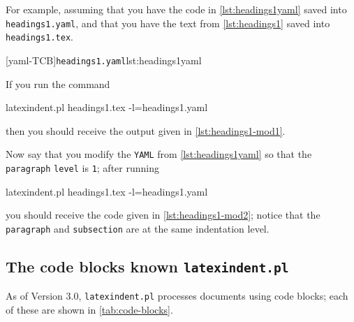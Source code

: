 	For example, assuming that you have the code in \cref{lst:headings1yaml} saved into \texttt{headings1.yaml},
	and that you have the text from \cref{lst:headings1} saved into \texttt{headings1.tex}.

	\begin{minipage}{.45\textwidth}
		[yaml-TCB]{\texttt{headings1.yaml}}{lst:headings1yaml}
	\end{minipage}%
	\hfill
	\begin{minipage}{.45\textwidth}
	\end{minipage}

	If you run the command
	\begin{commandshell}
latexindent.pl headings1.tex -l=headings1.yaml
\end{commandshell}
	then you should receive the output given in \cref{lst:headings1-mod1}.

	\begin{minipage}{.45\textwidth}
	\end{minipage}%
	\hfill
	\begin{minipage}{.45\textwidth}
	\end{minipage}

	Now say that you modify the \texttt{YAML} from \cref{lst:headings1yaml} so that the \texttt{paragraph} \texttt{level} is \texttt{1}; after
	running
	\begin{commandshell}
latexindent.pl headings1.tex -l=headings1.yaml
\end{commandshell}
	you should receive the code given in \cref{lst:headings1-mod2}; notice that
	the \texttt{paragraph} and \texttt{subsection} are at the same indentation level.

\subsection{The code blocks known \texttt{latexindent.pl}}\label{subsubsec:code-blocks}
	As of Version 3.0, \texttt{latexindent.pl} processes documents using code blocks; each
	of these are shown in \cref{tab:code-blocks}.


